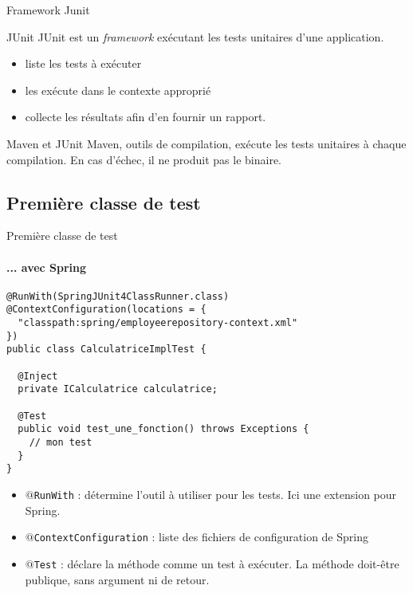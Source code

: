 \documentclass[compress]{beamer}%
\begin{document}
\begin{frame}{Framework Junit}

	\begin{block}{JUnit}
		JUnit est un \emph{framework} exécutant les tests unitaires d'une application.\\
		\pause
		\begin{itemize}
		\item liste les tests à exécuter
		\item les exécute dans le contexte approprié
		\item collecte les résultats afin d'en fournir un rapport.
		\end{itemize}
	\end{block}
		
	\pause
	\begin{block}{Maven et JUnit}
		Maven, outils de compilation, exécute les tests unitaires à chaque compilation. En cas d'échec, il ne produit pas le binaire.
	\end{block}

\end{frame}


\subsection{Première classe de test}

\begin{frame}[fragile]{Première classe de test}
	\framesubtitle{... avec Spring}
	
	\begin{lstlisting}	
@RunWith(SpringJUnit4ClassRunner.class)
@ContextConfiguration(locations = {
  "classpath:spring/employeerepository-context.xml"
})
public class CalculatriceImplTest {

  @Inject
  private ICalculatrice calculatrice;

  @Test
  public void test_une_fonction() throws Exceptions {
	// mon test
  }
}
	\end{lstlisting}
	
	\pause
	\begin{itemize}[<+->]
	\item \texttt{$@$RunWith} : détermine l'outil à utiliser pour les tests. Ici une extension pour Spring.
	\item \texttt{$@$ContextConfiguration} : liste des fichiers de configuration de Spring
	\item \texttt{$@$Test} : déclare la méthode comme un test à exécuter. La méthode doit-être publique, sans argument ni de retour.
	\end{itemize}

\end{frame}
\end{document}
